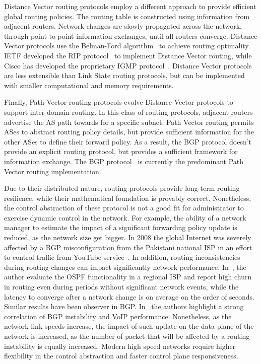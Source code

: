 Distance Vector routing protocols employ a different approach to provide
efficient global routing policies. The routing table is constructed using
information from adjacent routers. Network changes are slowly propagated across
the network, through point-to-point information exchanges, until all routers
converge.  Distance Vector protocols use the Belman-Ford
algorithm~\cite{bellman1956} to achieve routing optimality. IETF developed the
RIP  protocol~\cite{RFC2453} to implement Distance Vector routing, while Cisco
has developed the proprietary IGMP protocol~\cite{Rutgers1991}. Distance Vector
protocols are less extensible than Link State routing protocols, but can be
implemented with smaller computational and memory requirements.

Finally, Path Vector routing protocols evolve Distance
Vector protocols to support inter-domain routing. In this class of routing
protocols, adjacent routers advertise the AS path towards for a specific subnet. 
Path Vector routing permits ASes to abstract routing policy details, but provide
sufficient information for the other ASes to define their forward policy. As a
result, the BGP protocol doesn't provide an explicit routing protocol, but
provides a sufficient framework for information exchange.  The BGP
protocol~\cite{RFC1265} is currently the predominant Path Vector routing
implementation.

Due to their distributed nature, routing protocols provide long-term routing
resilience, while their mathematical foundation is provably correct.
Nonetheless, the control abstraction of these protocol is not a good fit for
administrator to exercise dynamic control in the network. For example, the
ability of a network manager to estimate the impact of a significant forwarding
policy update is reduced, as the network size get bigger.  In 2008 the global
Internet was severely affected by a BGP misconfiguration from the Pakistani
national ISP in an effort to control traffic from YouTube
service~\cite{bgp_config_error}.  In addition, routing inconsistencies during
routing changes can impact significantly network performance.
In~\cite{Watson2003}, the author evaluate the OSPF functionality in a regional
ISP and report high churn in routing even during periods without significant
network events, while the latency to converge after a network change is on
average on the order of seconds. Similar results have been observer in BGP\@.
In~\cite{Kushman2007} the authors highlight a strong correlation of BGP
instability and VoIP performance. Nonetheless, as the network link speeds
increase, the impact of such update on the data plane of the network is
increased, as the number of packet that will be affected by a routing
instability is equally increased. Modern high speed networks require higher
flexibility in the control abstraction and faster control plane responsiveness. 

